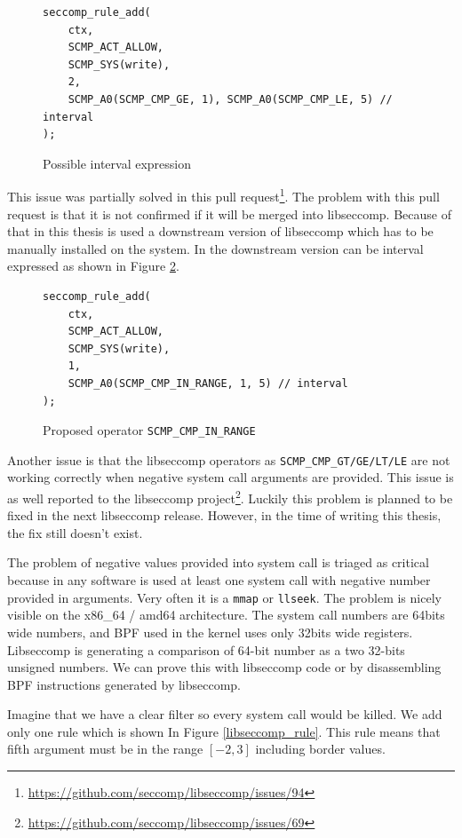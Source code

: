 \begin{figure}[h]
	\label{libseccomp_native}
	\lstset{style=c++}
	\begin{lstlisting}
seccomp_rule_add(
	ctx,
	SCMP_ACT_ALLOW,
	SCMP_SYS(write),
	2,
	SCMP_A0(SCMP_CMP_GE, 1), SCMP_A0(SCMP_CMP_LE, 5) // interval
);
	\end{lstlisting}
	\caption{Possible interval expression}
\end{figure}

This issue was partially solved in this pull
request\footnote{\url{https://github.com/seccomp/libseccomp/issues/94}}. The
problem with this pull request is that it is not confirmed if it will be merged
into libseccomp. Because of that in this thesis is used a downstream version of
libseccomp which has to be manually installed on the system. In the downstream
version can be interval expressed as shown in Figure \ref{libseccomp_in_range}.

\begin{figure}[h]
	\label{libseccomp_in_range}
	\lstset{style=c++}
	\begin{lstlisting}
seccomp_rule_add(
	ctx,
	SCMP_ACT_ALLOW,
	SCMP_SYS(write),
	1,
	SCMP_A0(SCMP_CMP_IN_RANGE, 1, 5) // interval
);
	\end{lstlisting}
	\caption{Proposed operator \texttt{SCMP\_CMP\_IN\_RANGE}}
\end{figure}

Another issue is that the libseccomp operators as
\texttt{SCMP\_CMP\_GT/GE/LT/LE} are not work\-ing correctly when negative system
call arguments are provided. This issue is as well reported to the libseccomp
project\footnote{\url{https://github.com/seccomp/libseccomp/issues/69}}. Luckily
this problem is planned to be fixed in the next libseccomp release. However, in
the time of writing this thesis, the fix still doesn’t exist.

The problem of negative values provided into system call is triaged as critical
because in any software is used at least one system call with negative number
provided in arguments. Very often it is a \texttt{mmap} or \texttt{llseek}. The
problem is nicely visible on the x86\_64 / amd64 architecture. The system call
numbers are 64bits wide numbers, and BPF used in the kernel uses only 32bits
wide registers. Libseccomp is generating a comparison of 64-bit number as a two
32-bits unsigned numbers. We can prove this with libseccomp code or by
disassembling BPF instructions generated by libseccomp.

Imagine that we have a clear filter so every system call would be killed. We add
only one rule which is shown In Figure \ref{libseccomp_rule}. This rule means
that fifth argument must be in the range $[-2, 3]$ including border values.

